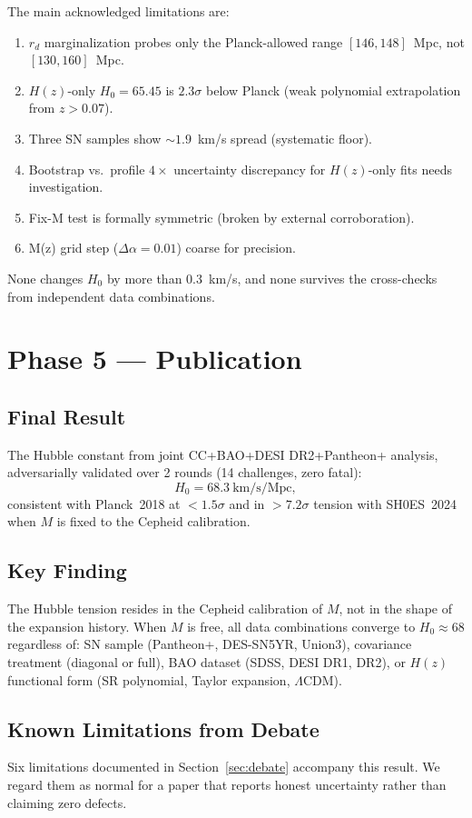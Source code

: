 \documentclass[twocolumn]{aastex631}
\begin{document}
The main acknowledged limitations are:
\begin{enumerate}
  \item $r_d$ marginalization probes only the Planck-allowed range
        $[146,148]$~Mpc, not $[130,160]$~Mpc.
  \item $H(z)$-only $H_0=65.45$ is $2.3\sigma$ below Planck (weak
        polynomial extrapolation from $z>0.07$).
  \item Three SN samples show $\sim1.9$~km/s spread (systematic floor).
  \item Bootstrap vs.\ profile $4\times$ uncertainty discrepancy for
        $H(z)$-only fits needs investigation.
  \item Fix-M test is formally symmetric (broken by external
        corroboration).
  \item M(z) grid step ($\Delta\alpha=0.01$) coarse for precision.
\end{enumerate}
None changes $H_0$ by more than $0.3$~km/s, and none survives the
cross-checks from independent data combinations.

\section{Phase 5 --- Publication}

\subsection{Final Result}
The Hubble constant from joint CC+BAO+DESI DR2+Pantheon+ analysis,
adversarially validated over 2 rounds (14 challenges, zero fatal):
\[
H_0 = 68.3\ \text{km/s/Mpc},
\]
consistent with Planck~2018 at $<1.5\sigma$ and in $>7.2\sigma$ tension
with SH0ES~2024 when $M$ is fixed to the Cepheid calibration.

\subsection{Key Finding}
The Hubble tension resides in the Cepheid calibration of $M$, not in
the shape of the expansion history.  When $M$ is free, all data
combinations converge to $H_0\approx68$ regardless of: SN sample
(Pantheon+, DES-SN5YR, Union3), covariance treatment (diagonal or
full), BAO dataset (SDSS, DESI DR1, DR2), or $H(z)$ functional form
(SR polynomial, Taylor expansion, $\Lambda$CDM).

\subsection{Known Limitations from Debate}
Six limitations documented in Section~\ref{sec:debate} accompany this
result.  We regard them as normal for a paper that reports honest
uncertainty rather than claiming zero defects.
\end{document}
